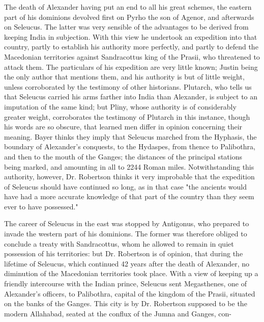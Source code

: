 \documentclass{article}
\begin{document}
The death of Alexander having put an end to all his great schemes, the eastern part of his dominions devolved first on Pyrho the son of Agenor, and afterwards on Seleucus. The latter was very sensible of the advantages to be derived from keeping India in subjection. With this view he undertook an expedition into that country, partly to establish his authority more perfectly, and partly to defend the Macedonian territories against Sandracottus king of the Prasii, who threatened to attack them. The particulars of his expedition are very little known; Justin being the only author that mentions them, and his authority is but of little weight, unless corroborated by the testimony of other historians. Plutarch, who tells us that Seleucus carried his arms farther into India than Alexander, is subject to an imputation of the same kind; but Pliny, whose authority is of considerably greater weight, corroborates the testimony of Plutarch in this instance, though his words are so obscure, that learned men differ in opinion concerning their meaning. Bayer thinks they imply that Seleucus marched from the Hyphasis, the boundary of Alexander's conquests, to the Hydaspes, from thence to Palibothra, and then to the mouth of the Ganges; the distances of the principal stations being marked, and amounting in all to 2244 Roman miles. Notwithstanding this authority, however, Dr. Robertson thinks it very improbable that the expedition of Seleucus should have continued so long, as in that case "the ancients would have had a more accurate knowledge of that part of the country than they seem ever to have possessed."

The career of Seleucus in the east was stopped by Antigonus, who prepared to invade the western part of his dominions. The former was therefore obliged to conclude a treaty with Sandracottus, whom he allowed to remain in quiet possession of his territories: but Dr. Robertson is of opinion, that during the lifetime of Seleucus, which continued 42 years after the death of Alexander, no diminution of the Macedonian territories took place. With a view of keeping up a friendly intercourse with the Indian prince, Seleucus sent Megasthenes, one of Alexander's officers, to Palibothra, capital of the kingdom of the Prasii, situated on the banks of the Ganges. This city is by Dr. Robertson supposed to be the modern Allahabad, seated at the conflux of the Jumna and Ganges, con-
\end{document}
